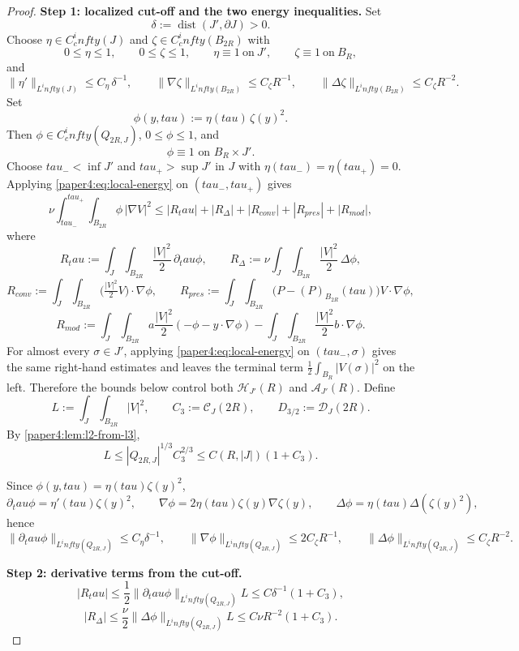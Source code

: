 \documentclass[11pt]{amsart}
\def\mathrm#1{#1}%
\def\tau{tau}%
\def\infty{infty}%
\theoremstyle{plain}
\theoremstyle{definition}
\theoremstyle{remark}
\begin{document}
\begin{proof}
\textbf{Step 1: localized cut-off and the two energy inequalities.}
Set
\[
\delta:=\operatorname{dist}(J',\partial J)>0.
\]
Choose $\eta\in C_c^\infty(J)$ and $\zeta\in C_c^\infty(B_{2R})$ with
\[
0\le\eta\le1,\qquad
0\le\zeta\le1,\qquad
\eta\equiv1\ \text{on}\ J',\qquad
\zeta\equiv1\ \text{on}\ B_R,
\]
and
\[
\|\eta'\|_{L^\infty(J)}\le C_\eta\,\delta^{-1},
\qquad
\|\nabla\zeta\|_{L^\infty(B_{2R})}\le C_\zeta R^{-1},
\qquad
\|\Delta\zeta\|_{L^\infty(B_{2R})}\le C_\zeta R^{-2}.
\]
Set
\[
\phi(y,\tau):=\eta(\tau)\,\zeta(y)^2.
\]
Then $\phi\in C_c^\infty(Q_{2R,J})$, $0\le\phi\le1$, and
\[
\phi\equiv1\text{ on }B_R\times J'.
\]
Choose $\tau_-<\inf J'$ and $\tau_+>\sup J'$ in $J$ with
$\eta(\tau_-)=\eta(\tau_+)=0$. Applying \eqref{paper4:eq:local-energy} on
$(\tau_-,\tau_+)$ gives
\[
\nu\int_{\tau_-}^{\tau_+}\!\int_{B_{2R}}\phi\,|\nabla V|^2
\le |R_\tau|+|R_\Delta|+|R_{\mathrm{conv}}|+|R_{\mathrm{pres}}|+|R_{\mathrm{mod}}|,
\]
where
\[
R_\tau:=\int_J\!\int_{B_{2R}}\frac{|V|^2}{2}\,\partial_\tau\phi,\qquad
R_\Delta:=\nu\int_J\!\int_{B_{2R}}\frac{|V|^2}{2}\,\Delta\phi,
\]
\[
R_{\mathrm{conv}}:=\int_J\!\int_{B_{2R}}\bigl(\tfrac{|V|^2}{2}V\bigr)\cdot\nabla\phi,\qquad
R_{\mathrm{pres}}:=\int_J\!\int_{B_{2R}}\bigl(P-(P)_{B_{2R}}(\tau)\bigr)V\cdot\nabla\phi,
\]
\[
R_{\mathrm{mod}}:=\int_J\!\int_{B_{2R}}
a\frac{|V|^2}{2}(-\phi-y\cdot\nabla\phi)
-\int_J\!\int_{B_{2R}}\frac{|V|^2}{2}b\cdot\nabla\phi.
\]
For almost every $\sigma\in J'$, applying \eqref{paper4:eq:local-energy} on
$(\tau_-,\sigma)$ gives the same right-hand estimates and leaves the terminal
term $\frac12\int_{B_R}|V(\sigma)|^2$ on the left. Therefore the bounds below
control both $\mathcal H_{J'}(R)$ and $\mathcal A_{J'}(R)$.
Define
\[
L:=\int_J\!\int_{B_{2R}}|V|^2,\qquad
C_3:=\mathcal C_J(2R),\qquad D_{3/2}:=\mathcal D_J(2R).
\]
By \cref{paper4:lem:l2-from-l3},
\[
L\le |Q_{2R,J}|^{1/3}C_3^{2/3}\le C(R,|J|)(1+C_3).
\]

Since $\phi(y,\tau)=\eta(\tau)\zeta(y)^2$,
\[
\partial_\tau\phi=\eta'(\tau)\zeta(y)^2,
\qquad
\nabla\phi=2\eta(\tau)\zeta(y)\nabla\zeta(y),
\qquad
\Delta\phi=\eta(\tau)\Delta(\zeta(y)^2),
\]
hence
\[
\|\partial_\tau\phi\|_{L^\infty(Q_{2R,J})}\le C_\eta\delta^{-1},
\qquad
\|\nabla\phi\|_{L^\infty(Q_{2R,J})}\le 2C_\zeta R^{-1},
\qquad
\|\Delta\phi\|_{L^\infty(Q_{2R,J})}\le C_\zeta R^{-2}.
\]

\textbf{Step 2: derivative terms from the cut-off.}
\[
|R_\tau|
\le\frac12\|\partial_\tau\phi\|_{L^\infty(Q_{2R,J})}L
\le C\delta^{-1}(1+C_3),
\]
\[
|R_\Delta|
\le\frac{\nu}{2}\|\Delta\phi\|_{L^\infty(Q_{2R,J})}L
\le C\nu R^{-2}(1+C_3).
\]


\end{proof}
\end{document}
